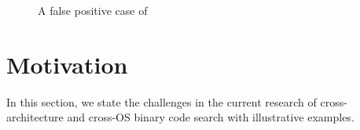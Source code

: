 \begin{figure}[th]
  \centering
  \hspace{1in}
  \caption{A false positive case of \tool}
  \label{fig:falseposi} %
\end{figure}

\section{Motivation} \label{sec:prob_state}
In this section, we state the challenges in the current research of cross-architecture and cross-OS binary code search  with illustrative examples. %




